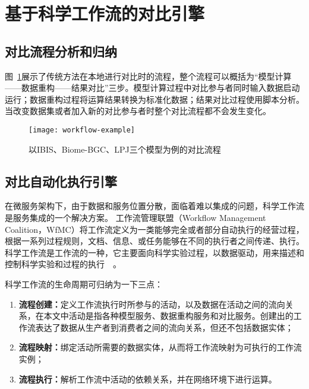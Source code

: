 \section{基于科学工作流的对比引擎}
\subsection{对比流程分析和归纳}
图~\ref{fig:workflow-example}展示了传统方法在本地进行对比时的流程，整个流程可以概括为“模型计算——数据重构——结果对比”三步。模型计算过程中对比参与者同时输入数据启动运行；数据重构过程将运算结果转换为标准化数据；结果对比过程使用脚本分析。当改变数据集或者加入新的对比参与者时整个对比流程都不会发生变化。

\begin{figure}[!htbp]
    \centering
    \texttt{[image: workflow-example]}
    \caption{以IBIS、Biome-BGC、LPJ三个模型为例的对比流程}
    \label{fig:workflow-example}
\end{figure}

\subsection{对比自动化执行引擎}
在微服务架构下，由于数据和服务位置分散，面临着难以集成的问题，科学工作流是服务集成的一个解决方案。 %
工作流管理联盟（Workflow Management Coalition，WfMC）将工作流定义为一类能够完全或者部分自动执行的经营过程，根据一系列过程规则，文档、信息、或任务能够在不同的执行者之间传递、执行。科学工作流是工作流的一种，它主要面向科学实验过程，以数据驱动，用来描述和控制科学实验和过程的执行~\cite{ludascher2006scientific}~\cite{Zhao2009Special}。

科学工作流的生命周期可归纳为一下三点：
\begin{enumerate}[(1)]
    \item \textbf{流程创建：}定义工作流执行时所参与的活动，以及数据在活动之间的流向关系，在本文中活动是指各种模型服务、数据重构服务和对比服务。创建出的工作流表达了数据从生产者到消费者之间的流向关系，但还不包括数据实体；
    \item \textbf{流程映射：}绑定活动所需要的数据实体，从而将工作流映射为可执行的工作流实例；
    \item \textbf{流程执行：}解析工作流中活动的依赖关系，并在网络环境下进行运算。
\end{enumerate}

